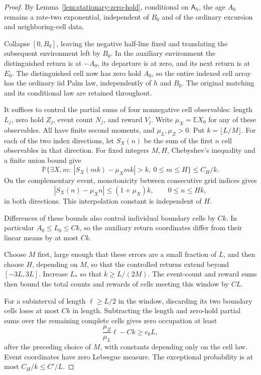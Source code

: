 \documentclass[11pt,reqno]{amsart}
\theoremstyle{definition}
\theoremstyle{remark}
\numberwithin{equation}{section}
\newcommand{\E}{\mathbb E}
\newcommand{\Pp}{\mathbb P}
\begin{document}
\begin{proof}
By Lemma~\ref{lem:stationary-zero-hold}, conditional on \(\mathsf A_h\),
the age \(A_0\) remains a rate-two exponential, independent of \(B_0\)
and of the ordinary excursion and neighboring-cell data.

Collapse \([0,B_0]\), leaving the negative half-line fixed and translating the
subsequent environment left by \(B_0\). In the auxiliary environment the
distinguished return is at \(-A_0\), its departure is at zero, and its
next return is at \(E_0\). The distinguished cell now has zero hold
\(A_0\), so the entire indexed cell array has the ordinary iid Palm law,
independently of \(h\) and \(B_0\). The original matching and its
conditional law are retained throughout.

It suffices to control the partial sums of four nonnegative cell
observables: length \(L_j\), zero hold \(Z_j\), event count \(N_j\),
and reward \(V_j\). Write \(\mu_X=\E X_0\) for any of these
observables. All have finite second moments, and \(\mu_L,\mu_Z>0\).
Put \(k=\lfloor L/M\rfloor\). For each of the two index directions,
let \(S_X(n)\) be the sum of the first \(n\) cell observables in that
direction. For fixed integers \(M,H\), Chebyshev's inequality and a
finite union bound give
\[
\Pp\bigl\{\exists X,m:\ |S_X(mk)-\mu_Xmk|>k,
\ 0\le m\le H\bigr\}\le C_H/k.
\]
On the complementary event, monotonicity between consecutive grid
indices gives
\[
|S_X(n)-\mu_Xn|\le(1+\mu_X)k,
\qquad 0\le n\le Hk,
\]
in both directions. This interpolation constant is independent of
\(H\).

Differences of these bounds also control individual boundary
cells by \(Ck\). In particular \(A_0\le L_0\le Ck\), so the
auxiliary return coordinates differ from their linear means by at most
\(Ck\).

Choose \(M\) first, large enough that these errors are a small
fraction of \(L\), and then choose \(H\), depending on \(M\), so
that the controlled returns extend beyond \([-3L,3L]\). Increase
\(L_*\) so that \(k\ge L/(2M)\). The event-count and reward sums
then bound the total counts and rewards of cells meeting this window
by \(CL\).

For a subinterval of length \(\ell\ge L/2\) in the
window, discarding its two boundary cells loses at most \(Ck\) in
length. Subtracting the length and zero-hold partial sums over the
remaining complete cells gives zero occupation at least
\[
\frac{\mu_Z}{\mu_L}\ell-Ck\ge c_0L,
\]
after the preceding choice of \(M\), with constants depending only
on the cell law. Event coordinates have zero Lebesgue measure. The
exceptional probability is at most \(C_H/k\le C'/L\).


\end{proof}
\end{document}
